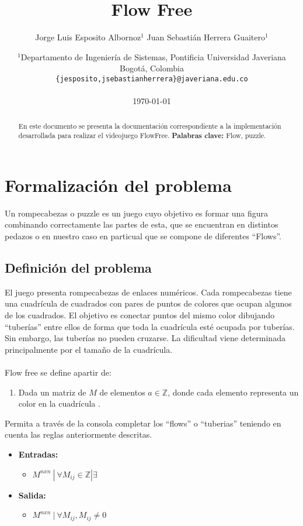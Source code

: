 \documentclass[letter]{article}
\title {Flow Free}
\author{ Jorge Luis Esposito Albornoz$^1$  Juan Sebastián Herrera Guaitero$^1$}
\date{
	$^1$Departamento de Ingeniería de Sistemas, Pontificia Universidad Javeriana\\Bogotá,  Colombia \\
	\texttt{\{jesposito,jsebastianherrera\}@javeriana.edu.co}\\~\\
	\today
}
\begin{document}
\maketitle

\begin{abstract}
	En este documento se presenta la documentaci\'on correspondiente a la implementaci\'on desarrollada para realizar el videojuego FlowFree.
	\textbf{Palabras clave:} Flow, puzzle.
\end{abstract}

\tableofcontents

\newpage
\section{Formalización del problema}
Un rompecabezas o puzzle  es un juego cuyo objetivo es formar una figura combinando correctamente las partes de esta, que se encuentran en distintos pedazos o en nuestro caso en particual que se compone de diferentes ``Flows''.

\subsection{Definici\'on del problema}
El juego presenta rompecabezas de enlaces numéricos. Cada rompecabezas tiene una cuadrícula de cuadrados con pares de puntos de colores que ocupan algunos de los cuadrados.
El objetivo es conectar puntos del mismo color dibujando ``tuber\'ias'' entre ellos de forma que toda la cuadrícula esté ocupada por tuberías. Sin embargo, las tuberías no pueden cruzarse. La dificultad viene determinada principalmente por el tamaño de la cuadrícula.\\\\
Flow free se define apartir de:
\begin{enumerate}
	\item Dada un matriz de $M$ de elementos $a \in \mathbb{Z} $, donde cada elemento representa un color en la cuadr\'icula .
\end{enumerate}
Permita a trav\'es de la consola completar los ``flows'' o ``tuberias'' teniendo en cuenta las reglas anteriormente descritas.
\begin{itemize}
	\item \textbf{Entradas:}
	      \begin{itemize}
		      \item $M^{nxn} ~ | ~ \forall M_{ij} \in \mathbb{Z} | \exists $
	      \end{itemize}
	\item \textbf{Salida:}
	      \begin{itemize}
		      \item $M^{nxn} ~ | ~ \forall M_{ij}, M_{ij} \neq 0 $
	      \end{itemize}
\end{itemize}
\end{document}
